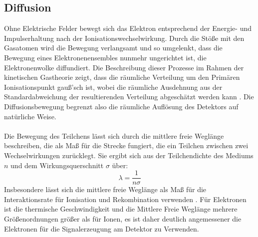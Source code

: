 		\subsection{Diffusion}	
		Ohne Elektrische Felder bewegt sich das Elektron entsprechend der Energie- und Impulserhaltung nach der Ionisationswechselwirkung. Durch die Stöße mit den Gasatomen wird die Bewegung verlangsamt und so umgelenkt, dass die Bewegung eines Elektronenensembles nunmehr ungerichtet ist, die Elektronenwolke diffundiert. Die Beschreibung dieser Prozesse im Rahmen der kinetischen Gastheorie zeigt, dass die räumliche Verteilung um den Primären Ionisationspunkt gauß'sch ist, wobei die räumliche Ausdehnung aus der Standardabweichung der resultierenden Verteilung abgeschätzt werden kann \cite{Sauli_Multiwire}. Die Diffusionsbewegung begrenzt also die räumliche Auflösung des Detektors auf natürliche Weise.\\
		\\
		Die Bewegung des Teilchens lässt sich durch die mittlere freie Weglänge beschreiben, die als Maß für die Strecke fungiert, die ein Teilchen zwischen zwei Wechselwirkungen zurücklegt. Sie ergibt sich aus der Teilchendichte des Mediums $n$ und dem Wirkungsquerschnitt $\sigma$ über:
		\begin{equation}
			\lambda=\frac{1}{n\sigma}
		\end{equation} 
		Insbesondere lässt sich die mittlere freie Weglänge als Maß für die Interaktionsrate für Ionisation und Rekombination verwenden \cite{Sauli_Multiwire}. Für Elektronen ist die thermische Geschwindigkeit und die Mittlere Freie Weglänge mehrere Größenordnungen größer als für Ionen, es ist daher deutlich angemessener die Elektronen für die Signalerzeugung am Detektor zu Verwenden.
		
